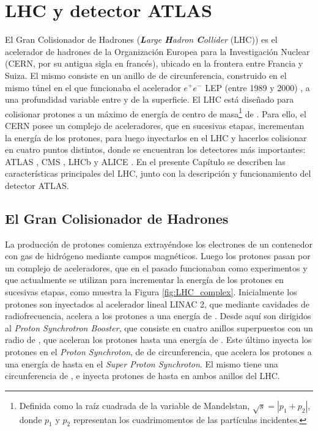 \chapter{LHC y detector ATLAS}




El Gran Colisionador de Hadrones (\textit{\textbf{L}arge \textbf{H}adron \textbf{C}ollider} (LHC)) \cite{Evans:1129806} es el acelerador de hadrones de la Organización Europea para la Investigación Nuclear (CERN, por su antigua sigla en francés), ubicado en la frontera entre Francia y Suiza. El mismo consiste en un anillo de  de circunferencia, construido en el mismo túnel en el que funcionaba el acelerador $e^{+}e^{-}$ LEP (entre 1989 y 2000) \cite{LEPbook}, a una profundidad variable entre  y  de la superficie. El LHC está diseñado para colisionar protones a un máximo de energía de centro de masa\footnote{Definida como la raíz cuadrada de la variable de Mandelstan, $\sqrt{s}=|p_1+p_2|$, donde $p_1$ y $p_2$ representan los cuadrimomentos de las partículas incidentes.} de . Para ello, el CERN posee un complejo de aceleradores, que en sucesivas etapas, incrementan la energía de los protones, para luego inyectarlos en el LHC y hacerlos colisionar en cuatro puntos distintos, donde se encuentran los detectores más importantes: ATLAS \cite{PERF-2007-01}, CMS \cite{CMS-TDR-08-001}, LHCb \cite{LHCb:2008vvz} y ALICE \cite{ALICE:2008ngc}. En el presente Capítulo se describen las características principales del LHC, junto con la descripción y funcionamiento del detector ATLAS.

\section{El Gran Colisionador de Hadrones}

La producción de protones comienza extrayéndose los electrones de un contenedor con gas de hidrógeno mediante campos magnéticos. Luego los protones pasan por un complejo de aceleradores, que en el pasado funcionaban como experimentos y que actualmente se utilizan para incrementar la energía de los protones en sucesivas etapas, como muestra la Figura \ref{fig:LHC_complex}. Inicialmente los protones son inyectados al acelerador lineal LINAC 2, que mediante cavidades de radiofrecuencia, acelera a los protones a una energía de . Desde aquí son dirigidos al \textit{Proton Synchrotron Booster}, que consiste en cuatro anillos superpuestos con un radio de , que aceleran los protones hasta una energía de . Este último inyecta los protones en el \textit{Proton Synchroton}, de  de circunferencia, que acelera los protones a una energía de hasta  en el \textit{Super Proton Synchroton}. El mismo tiene una circunferencia de , e inyecta protones de hasta  en ambos anillos del LHC. 

